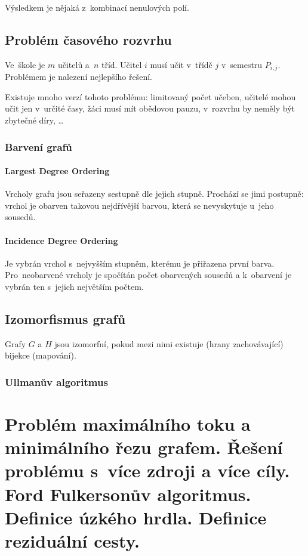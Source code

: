 Výsledkem je nějaká z~kombinací nenulových polí.

\subsection{Problém časového rozvrhu}

Ve~škole je $m$ učitelů a~$n$ tříd.
Učitel $i$ musí učit v~třídě $j$ v~semestru $P_{i,j}$.
Problémem je nalezení nejlepšího řešení.

Existuje mnoho verzí tohoto problému:
limitovaný počet učeben,
učitelé mohou učit jen v~určité časy,
žáci musí mít obědovou pauzu,
v~rozvrhu by neměly být zbytečné díry,
\dots

\subsubsection{Barvení grafů}

\paragraph{Largest Degree Ordering}

Vrcholy grafu jsou seřazeny sestupně dle jejich stupně.
Prochází se jimi postupně: vrchol je obarven takovou nejdřívější barvou, která se nevyskytuje u~jeho sousedů.

\paragraph{Incidence Degree Ordering}

Je vybrán vrchol s~nejvyšším stupněm, kterému je přiřazena první barva.
Pro~neobarvené vrcholy je spočítán počet obarvených sousedů a k~obarvení je vybrán ten s~jejich největším počtem.

\subsection{Izomorfismus grafů}

Grafy $G$ a $H$ jsou izomorfní, pokud mezi nimi existuje (hrany zachovávající) bijekce (mapování).

\subsubsection{Ullmanův algoritmus}

\clearpage
\section{Problém maximálního toku a minimálního řezu grafem. Řešení problému s~více zdroji a více cíly. Ford Fulkersonův algoritmus. Definice úzkého hrdla. Definice reziduální cesty.}


